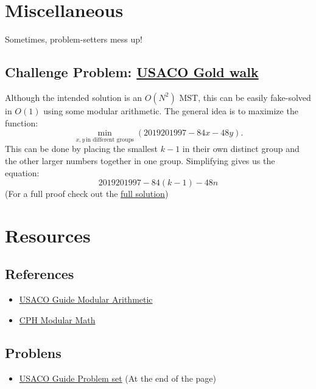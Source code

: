 \documentclass{article}
\begin{document}
\section{Miscellaneous}
    Sometimes, problem-setters mess up!
    \subsection{Challenge Problem: \href{http://www.usaco.org/index.php?page=viewproblem2&cpid=946}{USACO Gold walk}}
    \hspace{1em} \quad Although the intended solution is an $O(N^2)$ MST, this can be easily fake-solved in $O(1)$ using some modular arithmetic. The general idea is to maximize the function:
        $$
        \min\limits_{x,y \, \textrm{in different groups}} (2019201997 - 84 x - 48 y).
        $$
    This can be done by placing the smallest $k-1$ in their own distinct group and the other larger numbers together in one group. Simplifying gives us the equation:
    $$
    2019201997 - 84 (k-1) - 48 n
    $$
    (For a full proof check out the \href{https://usaco.guide/solutions/usaco-946}{full solution})
\section{Resources}
    \subsection{References}
    \begin{itemize}
        \item \href{https://usaco.guide/gold/modular}{USACO Guide Modular Arithmetic}
        \item \href{https://usaco.guide/CPH.pdf#page=211}{CPH Modular Math}
    \end{itemize}
        
    \subsection{Problens}
        \begin{itemize}
            \item \href{https://usaco.guide/gold/modular}{USACO Guide Problem set} (At the end of the page)
        \end{itemize}
\end{document}
